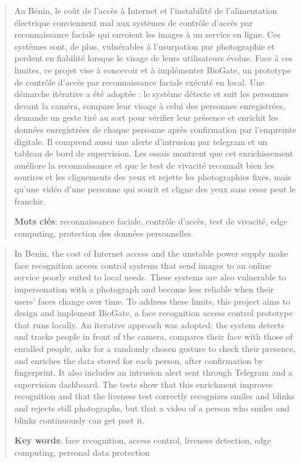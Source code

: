 \resume
{}
\vspace*{-6cm}
\begin{abstract}
\begin{maj}
Au Bénin, le coût de l'accès à Internet et l'instabilité de l'alimentation électrique conviennent mal aux systèmes de contrôle d'accès par reconnaissance faciale qui envoient les images à un service en ligne. Ces systèmes sont, de plus, vulnérables à l'usurpation par photographie et perdent en fiabilité lorsque le visage de leurs utilisateurs évolue. Face à ces limites, ce projet vise à concevoir et à implémenter BioGate, un prototype de contrôle d'accès par reconnaissance faciale exécuté en local. Une démarche itérative a été adoptée : le système détecte et suit les personnes devant la caméra, compare leur visage à celui des personnes enregistrées, demande un geste tiré au sort pour vérifier leur présence et enrichit les données enregistrées de chaque personne après confirmation par l'empreinte digitale. Il comprend aussi une alerte d'intrusion par \gls{telegram} et un tableau de bord de supervision. Les essais montrent que cet enrichissement améliore la reconnaissance et que le test de vivacité reconnaît bien les sourires et les clignements des yeux et rejette les photographies fixes, mais qu'une vidéo d'une personne qui sourit et cligne des yeux sans cesse peut le franchir.
\end{maj}

\par\medskip
\textbf{Mots clés}: reconnaissance faciale, contrôle d'accès, test de vivacité, edge computing, protection des données personnelles
\end{abstract}

\newpage
\thispagestyle{empty}
\begin{abstract}
\begin{maj}
In Benin, the cost of Internet access and the unstable power supply make face recognition access control systems that send images to an online service poorly suited to local needs. These systems are also vulnerable to impersonation with a photograph and become less reliable when their users' faces change over time. To address these limits, this project aims to design and implement BioGate, a face recognition access control prototype that runs locally. An iterative approach was adopted: the system detects and tracks people in front of the camera, compares their face with those of enrolled people, asks for a randomly chosen gesture to check their presence, and enriches the data stored for each person, after confirmation by fingerprint. It also includes an intrusion alert sent through Telegram and a supervision dashboard. The tests show that this enrichment improves recognition and that the liveness test correctly recognizes smiles and blinks and rejects still photographs, but that a video of a person who smiles and blinks continuously can get past it.
\end{maj}

\par\medskip
\textbf{Key words}: face recognition, access control, liveness detection, edge computing, personal data protection
\end{abstract}
